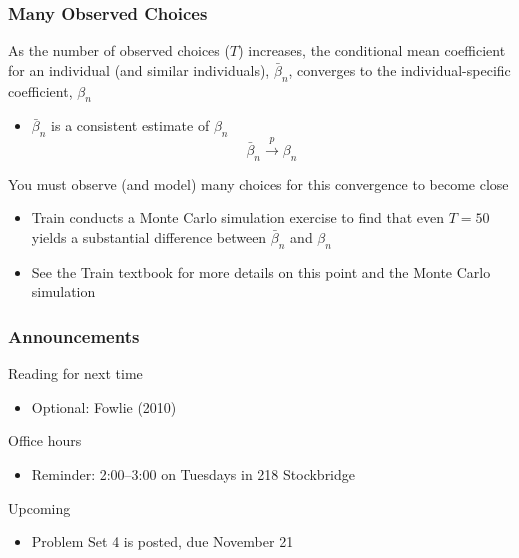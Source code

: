 \documentclass{beamer}
\begin{document}
\begin{frame}\frametitle{Many Observed Choices}
    As the number of observed choices ($T$) increases, the conditional mean coefficient for an individual (and similar individuals), $\bar{\beta}_n$, converges to the individual-specific coefficient, $\beta_n$
    \begin{itemize}
    	\item $\bar{\beta}_n$ is a consistent estimate of $\beta_n$
    	$$\bar{\beta}_n \overset{p}{\rightarrow} \beta_n$$
    \end{itemize}
    \vspace{3ex}
    You must observe (and model) many choices for this convergence to become close
    \begin{itemize}
    	\item Train conducts a Monte Carlo simulation exercise to find that even $T = 50$ yields a substantial difference between $\bar{\beta}_n$ and $\beta_n$
    	\item See the Train textbook for more details on this point and the Monte Carlo simulation
    \end{itemize}
\end{frame}

\begin{frame}\frametitle{Announcements}
    Reading for next time
    \begin{itemize}
        \item Optional: Fowlie (2010)
    \end{itemize}
    \vspace{3ex}
    Office hours
    \begin{itemize}
    	\item Reminder: 2:00--3:00 on Tuesdays in 218 Stockbridge
    \end{itemize}
    \vspace{3ex}
    Upcoming
    \begin{itemize}
        \item Problem Set 4 is posted, due November 21
    \end{itemize}
\end{frame}
\end{document}
